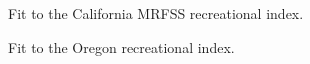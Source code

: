 \documentclass[
]{scrartcl}
\begin{document}
\clearpage

\begin{figure}


\caption{\label{fig-indexfit3}Fit to the California MRFSS recreational
index.}

\end{figure}%

\begin{figure}


\caption{\label{fig-indexfit6}Fit to the Oregon recreational index.}

\end{figure}%
\end{document}

